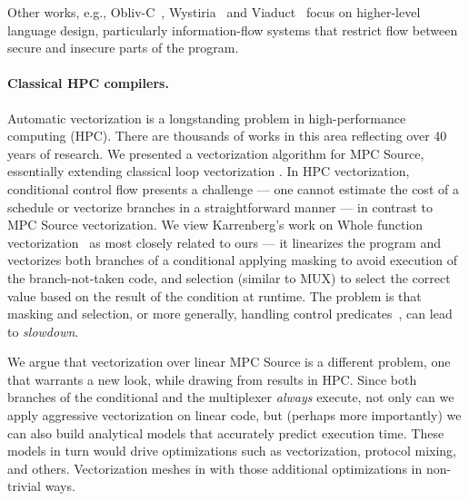 Other works, e.g., Obliv-C~\cite{Zahur:2015}, Wystiria~\cite{SP:RasHamHic14} and Viaduct~\cite{Acay:2021} focus on higher-level language design, particularly information-flow systems that
restrict flow between secure and insecure parts of the program.


\paragraph{Classical HPC compilers.}
Automatic vectorization is a longstanding problem in high-performance computing (HPC).
There are thousands of works in this area reflecting over 40 years of research. We presented a vectorization
algorithm for MPC Source, essentially extending classical loop vectorization \cite{Allen:1987}. In HPC vectorization, conditional control flow
presents a challenge --- one cannot estimate the cost of a schedule or vectorize branches in a straightforward manner --- in contrast to
MPC Source vectorization.
We view Karrenberg's work on Whole function vectorization~\cite{Karrenberg:2015} as most closely related to ours --- it linearizes the program and vectorizes
both branches of a conditional applying masking to avoid execution of the branch-not-taken code, and selection (similar to MUX) to select the correct value based on the
result of the condition at runtime.
The problem is that masking and selection, or more generally, handling control predicates~\cite{Benabderrahmane:2010,Karrenberg:2015},
can lead to \emph{slowdown}.

We argue that vectorization over linear MPC Source is a different problem, one that warrants a new look, while drawing from
results in HPC.
Since both branches of the conditional and the multiplexer \emph{always} execute, not only can we apply aggressive vectorization on linear code, but (perhaps more importantly)
we can also build analytical models that accurately predict execution time. These models in turn would drive optimizations such as vectorization, protocol mixing, and others.
Vectorization meshes in with those additional optimizations in non-trivial ways.

